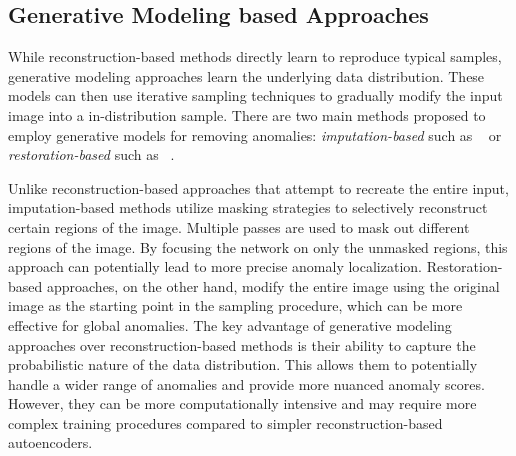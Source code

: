 \subsection*{Generative Modeling based Approaches}

While reconstruction-based methods directly learn to reproduce typical samples, generative modeling approaches learn the underlying data distribution. These models can then use iterative sampling techniques to gradually modify the input image into a in-distribution sample. There are two main methods proposed to employ generative models for removing anomalies: \textit{imputation-based} such as ~\cite{liuUnsupervisedOutofDistributionDetection2023} or \textit{restoration-based} such as ~\cite{pmlr-v102-you19a}.


Unlike reconstruction-based approaches that attempt to recreate the entire input, imputation-based methods utilize masking strategies to selectively reconstruct certain regions of the image. Multiple passes are used to mask out different regions of the image. By focusing the network on only the unmasked regions, this approach can potentially lead to more precise anomaly localization. Restoration-based approaches, on the other hand, modify the entire image using the original image as the starting point in the sampling procedure, which can be more effective for global anomalies. The key advantage of generative modeling approaches over reconstruction-based methods is their ability to capture the probabilistic nature of the data distribution. This allows them to potentially handle a wider range of anomalies and provide more nuanced anomaly scores. However, they can be more computationally intensive and may require more complex training procedures compared to simpler reconstruction-based autoencoders.

